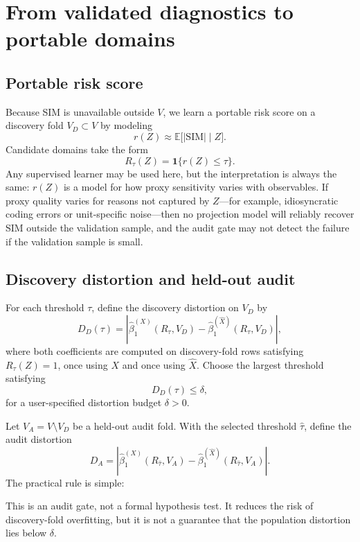 \documentclass[11pt]{article}
\newcommand{\E}{\mathbb{E}}
\newcommand{\1}{\mathbf{1}}
\begin{document}
\section{From validated diagnostics to portable domains}

\subsection{Portable risk score}

Because SIM is unavailable outside $V$, we learn a portable risk score on a discovery fold $V_D\subset V$ by modeling
\begin{equation}
 r(Z) \approx \E\bigl[|\mathrm{SIM}| \mid Z\bigr].
 \label{eq:risk_score}
\end{equation}
Candidate domains take the form
\[
R_\tau(Z)=\1\{r(Z)\le \tau\}.
\]
Any supervised learner may be used here, but the interpretation is always the same: $r(Z)$ is a model for how proxy sensitivity varies with observables. If proxy quality varies for reasons not captured by $Z$---for example, idiosyncratic coding errors or unit-specific noise---then no projection model will reliably recover SIM outside the validation sample, and the audit gate may not detect the failure if the validation sample is small.

\subsection{Discovery distortion and held-out audit}

For each threshold $\tau$, define the discovery distortion on $V_D$ by
\begin{equation}
D_D(\tau)=\left|\hat\beta_1^{(X)}(R_\tau,V_D)-\hat\beta_1^{(\hat X)}(R_\tau,V_D)\right|,
\label{eq:discovery_distortion}
\end{equation}
where both coefficients are computed on discovery-fold rows satisfying $R_\tau(Z)=1$, once using $X$ and once using $\hat X$. Choose the largest threshold satisfying
\[
D_D(\tau)\le \delta,
\]
for a user-specified distortion budget $\delta>0$.

Let $V_A=V\setminus V_D$ be a held-out audit fold. With the selected threshold $\hat\tau$, define the audit distortion
\begin{equation}
D_A=\left|\hat\beta_1^{(X)}(R_{\hat\tau},V_A)-\hat\beta_1^{(\hat X)}(R_{\hat\tau},V_A)\right|.
\label{eq:audit_distortion}
\end{equation}
The practical rule is simple:
\begin{center}
\end{center}
This is an audit gate, not a formal hypothesis test. It reduces the risk of discovery-fold overfitting, but it is not a guarantee that the population distortion lies below $\delta$.
\end{document}
